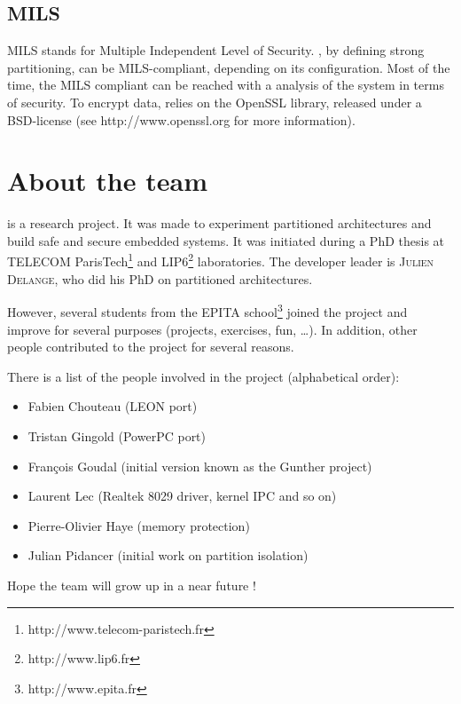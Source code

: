       \subsection{MILS}
      MILS stands for Multiple Independent Level of Security. \pok, by defining
      strong partitioning, can be MILS-compliant, depending on its
      configuration. Most of the time, the MILS compliant can be reached with
      a analysis of the system in terms of security. To encrypt data, \pok
      relies on the OpenSSL library, released under a BSD-license (see
      http://www.openssl.org for more information).

   \section{About the \pok team}
   \pok is a research project. It was made to experiment partitioned
   architectures and build safe and secure embedded systems. It was initiated
   during a PhD thesis at TELECOM
   ParisTech\footnote{http://www.telecom-paristech.fr} and
   LIP6\footnote{http://www.lip6.fr} laboratories. The developer leader is
   \textsc{Julien Delange}, who did his PhD on partitioned architectures.

   However, several students from the EPITA school\footnote{http://www.epita.fr}
   joined the project and improve for several purposes (projects, exercises, fun,
   \ldots). In addition, other people contributed to the project for several
   reasons.

   There is a list of the people involved in the project (alphabetical order):
   \begin{itemize}
      \item
         Fabien Chouteau (LEON port)
      \item
         Tristan Gingold (PowerPC port)
      \item
         François Goudal (initial version known as the Gunther project)
      \item
         Laurent Lec (Realtek 8029 driver, kernel IPC and so on)
      \item
         Pierre-Olivier Haye (memory protection)
      \item
         Julian Pidancer (initial work on partition isolation)
   \end{itemize}

   Hope the team will grow up in a near future !

